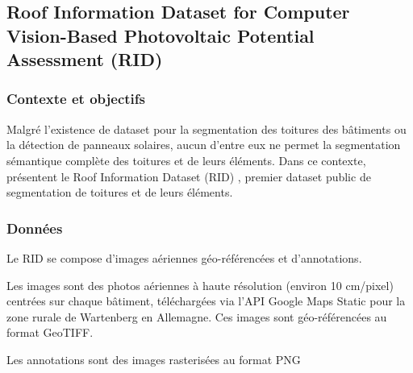 \subsection{Roof Information Dataset for Computer Vision-Based Photovoltaic Potential Assessment (RID)}
\label{subsec:rid_roof_information_dataset}

\subsubsection{Contexte et objectifs}
\par{Malgré l'existence de dataset pour la segmentation des toitures des bâtiments ou la détection de panneaux solaires, aucun d'entre eux ne permet la segmentation sémantique complète des toitures et de leurs éléments. Dans ce contexte, \citeauthor{krapf_ridroof_2022} présentent le Roof Information Dataset (RID) \cite{krapf_ridroof_2022}, premier dataset public de segmentation de toitures et de leurs éléments.}

\subsubsection{Données}
\par{Le RID se compose d'images aériennes géo-référencées et d'annotations.}
\par{Les images sont des photos aériennes à haute résolution (environ 10 \si{\unit{cm/pixel}}) centrées sur chaque bâtiment, téléchargées via l'API Google Maps Static pour la zone rurale de Wartenberg en Allemagne. Ces images sont géo-référencées au format GeoTIFF.}
\par{Les annotations sont des images rasterisées au format PNG}

